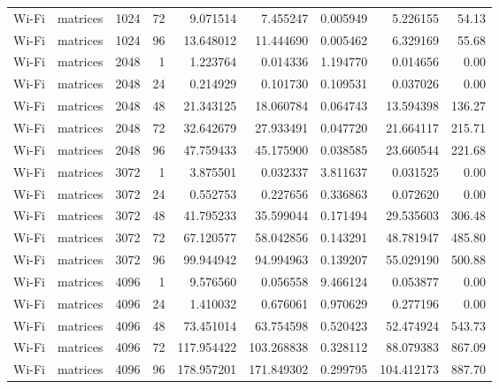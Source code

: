 \begin{longtable}{llrrrrrrr}
Wi-Fi & matrices & 1024 & 72 & 9.071514 & 7.455247 & 0.005949 & 5.226155 & 54.13 \\
Wi-Fi & matrices & 1024 & 96 & 13.648012 & 11.444690 & 0.005462 & 6.329169 & 55.68 \\
Wi-Fi & matrices & 2048 & 1 & 1.223764 & 0.014336 & 1.194770 & 0.014656 & 0.00 \\
Wi-Fi & matrices & 2048 & 24 & 0.214929 & 0.101730 & 0.109531 & 0.037026 & 0.00 \\
Wi-Fi & matrices & 2048 & 48 & 21.343125 & 18.060784 & 0.064743 & 13.594398 & 136.27 \\
Wi-Fi & matrices & 2048 & 72 & 32.642679 & 27.933491 & 0.047720 & 21.664117 & 215.71 \\
Wi-Fi & matrices & 2048 & 96 & 47.759433 & 45.175900 & 0.038585 & 23.660544 & 221.68 \\
Wi-Fi & matrices & 3072 & 1 & 3.875501 & 0.032337 & 3.811637 & 0.031525 & 0.00 \\
Wi-Fi & matrices & 3072 & 24 & 0.552753 & 0.227656 & 0.336863 & 0.072620 & 0.00 \\
Wi-Fi & matrices & 3072 & 48 & 41.795233 & 35.599044 & 0.171494 & 29.535603 & 306.48 \\
Wi-Fi & matrices & 3072 & 72 & 67.120577 & 58.042856 & 0.143291 & 48.781947 & 485.80 \\
Wi-Fi & matrices & 3072 & 96 & 99.944942 & 94.994963 & 0.139207 & 55.029190 & 500.88 \\
Wi-Fi & matrices & 4096 & 1 & 9.576560 & 0.056558 & 9.466124 & 0.053877 & 0.00 \\
Wi-Fi & matrices & 4096 & 24 & 1.410032 & 0.676061 & 0.970629 & 0.277196 & 0.00 \\
Wi-Fi & matrices & 4096 & 48 & 73.451014 & 63.754598 & 0.520423 & 52.474924 & 543.73 \\
Wi-Fi & matrices & 4096 & 72 & 117.954422 & 103.268838 & 0.328112 & 88.079383 & 867.09 \\
Wi-Fi & matrices & 4096 & 96 & 178.957201 & 171.849302 & 0.299795 & 104.412173 & 887.70 \\
\bottomrule\end{longtable}
